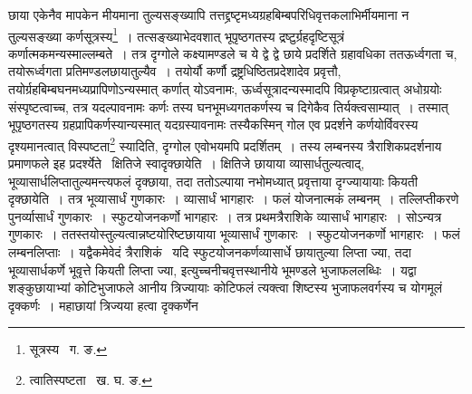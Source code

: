 \documentclass[11pt, openany]{book}
\begin{document}
\noindent छाया एकेनैव मापकेन मीयमाना तुल्यसङ्ख्यापि तत्तद्द्रष्टृमध्यग्रहबिम्बपरिधिवृत्तकलाभिर्मीयमाना न 
तुल्यसङ्ख्या कर्णसूत्रस्य\renewcommand{\thefootnote}{१}\footnote{सूत्रस्य \textendash\ ग. ङ.}~।
तत्सङ्ख्याभेदवशात् भूपृष्ठगतस्य द्रष्टुर्ग्रहदृष्टिसूत्रं कर्णात्मकमन्यस्माल्लम्बते~। तत्र दृग्गोले कक्ष्यामण्डले च ये द्वे द्वे छाये प्रदर्शिते
ग्रहावधिका ततऊर्ध्वगता च, तयोरूर्ध्वगता प्रतिमण्डलछायातुल्यैव~। तयोर्यौ कर्णौ द्रष्ट्रधिष्ठितप्रदेशादेव प्रवृत्तौ,
तयोर्ग्रहबिम्बघनमध्यप्रापिणोऽन्यस्मात् कर्णात् योऽवनामः, ऊर्ध्वसूत्रादन्यस्मादपि विप्रकृष्टाग्रत्वात् अधोग्रयोः संस्पृष्टत्वाच्च, तत्र यदल्पावनामः कर्णः तस्य घनभूमध्यगतकर्णस्य च दिगेकैव तिर्यक्त्वसाम्यात्~। तस्मात् भूपृष्ठगतस्य ग्रहप्रापिकर्णस्यान्यस्मात् यदग्रस्यावनामः तस्यैकस्मिन् गोल एव प्रदर्शने कर्णयोर्विवरस्य दृश्यमानत्वात् विस्पष्टता\renewcommand{\thefootnote}{२}\footnote{त्वातिस्पष्टता \textendash\ ख. घ. ङ.} स्यादिति, दृग्गोल एवोभयमपि प्रदर्शितम्~। तस्य लम्बनस्य त्रैराशिकप्रदर्शनाय प्रमाणफले इह प्रदर्श्येते \textendash\ क्षितिजे स्वादृक्छायेति~। क्षितिजे छायाया व्यासार्धतुल्यत्वाद्, भूव्यासार्धलिप्तातुल्यमन्त्यफलं दृक्छाया, तदा ततोऽल्पाया नभोमध्यात् प्रवृत्ताया दृग्ज्यायायाः कियती दृक्छायेति~। तत्र भूव्यासार्धं गुणकारः~। व्यासार्धं भागहारः~। फलं योजनात्मकं लम्बनम्~। तल्लिप्तीकरणे पुनर्व्यासार्धं गुणकारः~। स्फुटयोजनकर्णो भागहारः~। तत्र प्रथमत्रैराशिके व्यासार्धं भागहारः~। सोऽन्यत्र गुणकारः~। ततस्तयोस्तुल्यत्वान्नष्टयोरिष्टछायाया भूव्यासार्धं गुणकारः~। स्फुटयोजनकर्णो भागहारः~। फलं लम्बनलिप्ताः~। यद्वैकमेवेदं त्रैराशिकं \textendash\ यदि स्फुटयोजनकर्णव्यासार्धे छायातुल्या लिप्ता ज्या, तदा भूव्यासार्धकर्णे भूवृत्ते कियती लिप्ता ज्या, इत्युच्चनीचवृत्तस्थानीये भूमण्डले भुजाफललब्धिः~। यद्वा शङ्कुछायाभ्यां 
कोटिभुजाफले आनीय त्रिज्यायाः कोटिफलं त्यक्त्वा शिष्टस्य भुजाफलवर्गस्य च योगमूलं दृक्कर्णः~। महाछायां त्रिज्यया हत्वा दृक्कर्णेन


\newpage
\end{document}

